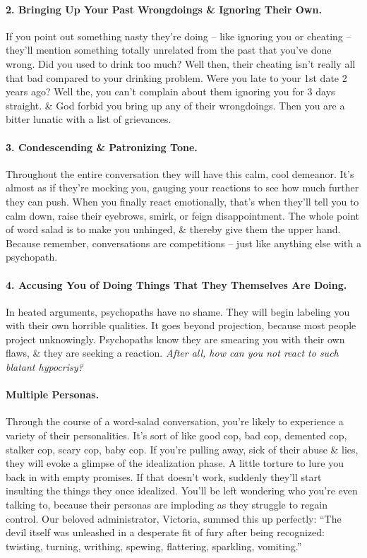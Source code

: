 \documentclass{article}
\numberwithin{equation}{section}
\begin{document}
\paragraph{2. Bringing Up Your Past Wrongdoings \& Ignoring Their Own.} If you point out something nasty they're doing -- like ignoring you or cheating -- they'll mention something totally unrelated from the past that you've done wrong. Did you used to drink too much? Well then, their cheating isn't really all that bad compared to your drinking problem. Were you late to your 1st date 2 years ago? Well the, you can't complain about them ignoring you for 3 days straight. \& God forbid you bring up any of their wrongdoings. Then you are a bitter lunatic with a list of grievances.

\paragraph{3. Condescending \& Patronizing Tone.} Throughout the entire conversation they will have this calm, cool demeanor. It's almost as if they're mocking you, gauging your reactions to see how much further they can push. When you finally react emotionally, that's when they'll tell you to calm down, raise their eyebrows, smirk, or feign disappointment. The whole point of word salad is to make you unhinged, \& thereby give them the upper hand. Because remember, conversations are competitions -- just like anything else with a psychopath.

\paragraph{4. Accusing You of Doing Things That They Themselves Are Doing.} In heated arguments, psychopaths have no shame. They will begin labeling you with their own horrible qualities. It goes beyond projection, because most people project unknowingly. Psychopaths know they are smearing you with their own flaws, \& they are seeking a reaction. \textit{After all, how can you not react to such blatant hypocrisy?}

\paragraph{Multiple Personas.} Through the course of a word-salad conversation, you're likely to experience a variety of their personalities. It's sort of like good cop, bad cop, demented cop, stalker cop, scary cop, baby cop. If you're pulling away, sick of their abuse \& lies, they will evoke a glimpse of the idealization phase. A little torture to lure you back in with empty promises. If that doesn't work, suddenly they'll start insulting the things they once idealized. You'll be left wondering who you're even talking to, because their personas are imploding as they struggle to regain control. Our beloved administrator, Victoria, summed this up perfectly: ``The devil itself was unleashed in a desperate fit of fury after being recognized: twisting, turning, writhing, spewing, flattering, sparkling, vomiting.''
\end{document}
